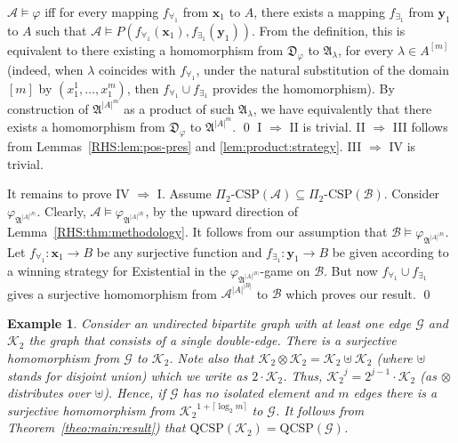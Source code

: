 \documentclass{LMCS}
\newtheorem{ex}{Example}
\newcommand{\tuple}[1]{\ensuremath{\mathbf{#1}}}
\begin{document}
\proof
  $\mathcal{A} \models \varphi$ iff for every mapping $f_{\forall_1}$ from $\tuple{x}_1$ to
  $A$, there exists a mapping $f_{\exists_1}$ from $\tuple{y}_1$ to $A$ such that
$\mathcal{A} \models P(f_{\forall_1}(\tuple{x}_1), f_{\exists_1}(\tuple{y}_1))$.
From the definition, this is equivalent to there existing a homomorphism from $\mathfrak{D}_\varphi$ to $\mathfrak{A}_\lambda$, for every $\lambda \in A^{[m]}$ (indeed, when $\lambda$ coincides with $f_{\forall_1}$, under the natural substitution of the domain $[m]$ by $(x^1_1,\ldots,x^m_1)$, then  $f_{\forall_1} \cup f_{\exists_1}$ provides the homomorphism).
 By construction of $\mathfrak{A}^{|A|^m}$ as a product of such
  $\mathfrak{A}_\lambda$, we have equivalently that there exists a homomorphism
  from $\mathfrak{D}_\varphi$ to $\mathfrak{A}^{|A|^m}$.
\qed
{}
I $\Rightarrow$ II  is trivial. II $\Rightarrow$ III follows from Lemmas~\ref{RHS:lem:pos-pres} and \ref{lem:product:strategy}.  III $\Rightarrow$ IV is trivial. 

It remains to prove  IV $\Rightarrow$ I. Assume $\Pi_2\mbox{-}\mathrm{CSP}(\mathcal{A})  \subseteq \Pi_2\mbox{-}\mathrm{CSP}(\mathcal{B})$. Consider $\varphi_{\mathfrak{A}^{|A|^{|B|}}}$. Clearly, $\mathcal{A} \models \varphi_{\mathfrak{A}^{|A|^{|B|}}}$, by the upward direction of Lemma~\ref{RHS:thm:methodology}. It follows from our assumption that $\mathcal{B} \models \varphi_{\mathfrak{A}^{|A|^{|B|}}}$. Let $f_{\forall_1}:\tuple{x}_1 \rightarrow B$ be any surjective function and $f_{\exists_1}:\tuple{y}_1 \rightarrow B$ be given according to a winning strategy for Existential in the $\varphi_{\mathfrak{A}^{|A|^{|B|}}}$-game on $\mathcal{B}$. But now $f_{\forall_1} \cup f_{\exists_1}$ gives a surjective homomorphism from $\mathcal{A}^{|A|^{|B|}}$ to $\mathcal{B}$ which proves our result.
\qed
\begin{ex}\label{ex:bip}
  Consider an undirected bipartite graph with at least one edge
  $\mathcal{G}$ and $\mathcal{K}_2$ the graph that consists of a single double-edge.
  There is a surjective homomorphism from $\mathcal{G}$ to $\mathcal{K}_2$.
  Note also that $\mathcal{K}_2\otimes \mathcal{K}_2 = \mathcal{K}_2 \uplus\mathcal{K}_2$ (where $\uplus$ stands for disjoint union)
  which we write as $2\cdot \mathcal{K}_2$. Thus, ${\mathcal{K}_2}^j=2^{j-1}\cdot \mathcal{K}_2$ (as $\otimes$
  distributes over $\uplus$). Hence, if $\mathcal{G}$ has no isolated element and
  $m$ edges there is a surjective homomorphism from ${\mathcal{K}_2}^{1+\lceil \log_2
    m \rceil}$ to $\mathcal{G}$. It follows from Theorem~\ref{theo:main:result}) that  $\mathrm{QCSP}(\mathcal{K}_2)  = \mathrm{QCSP}(\mathcal{G})$.
\end{ex}
\end{document}
